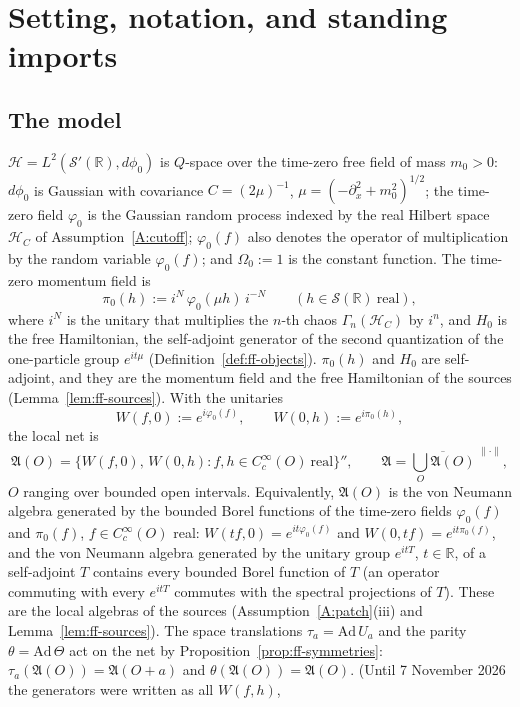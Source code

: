 \documentclass[11pt,a4paper]{article}
\theoremstyle{plain}
\theoremstyle{definition}
\theoremstyle{plain}
\theoremstyle{definition}
\newcommand{\R}{\mathbb{R}}
\newcommand{\A}{\mathfrak{A}}
\newcommand{\HH}{\mathcal{H}}
\newcommand{\Om}{\Omega}
\begin{document}
\section{Setting, notation, and standing imports}\label{sec:setting}

\subsection{The model}\label{subsec:model}

$\HH=L^2(\mathcal S'(\R),d\phi_0)$ is $Q$-space over the time-zero free field of mass $m_0>0$:
$d\phi_0$ is Gaussian with covariance $C=(2\mu)^{-1}$, $\mu=(-\partial_x^2+m_0^2)^{1/2}$; the
time-zero field $\varphi_0$ is the Gaussian random process indexed by the real Hilbert space
$\HH_C$ of Assumption~\ref{A:cutoff}; $\varphi_0(f)$ also denotes the operator of
multiplication by the random variable $\varphi_0(f)$; and $\Om_0:=1$ is the constant function.
The time-zero momentum field is
\[
 \pi_0(h):=i^N\,\varphi_0(\mu h)\,i^{-N}\qquad(h\in\mathcal S(\R)\ \text{real}),
\]
where $i^N$ is the unitary that multiplies the $n$-th chaos $\Gamma_n(\HH_C)$ by $i^n$, and
$H_0$ is the free Hamiltonian, the self-adjoint generator of the second quantization of the
one-particle group $e^{it\mu}$ (Definition~\ref{def:ff-objects}).  $\pi_0(h)$ and $H_0$ are
self-adjoint, and they are the momentum field and the free Hamiltonian of the sources
(Lemma~\ref{lem:ff-sources}).  With the unitaries
\[
 W(f,0):=e^{i\varphi_0(f)},\qquad W(0,h):=e^{i\pi_0(h)},
\]
the local net is
\[
\A(O)=\{W(f,0),\,W(0,h):f,h\in C_c^\infty(O)\ \text{real}\}'',\qquad
\A=\overline{\textstyle\bigcup_O\A(O)}^{\;\|\cdot\|} ,
\]
$O$ ranging over bounded open intervals.  Equivalently, $\A(O)$ is the von Neumann algebra
generated by the bounded Borel functions of the time-zero fields $\varphi_0(f)$ and
$\pi_0(f)$, $f\in C_c^\infty(O)$ real: $W(tf,0)=e^{it\varphi_0(f)}$ and $W(0,tf)=e^{it\pi_0(f)}$,
and the von Neumann algebra generated by the unitary group $e^{itT}$, $t\in\R$, of a
self-adjoint $T$ contains every bounded Borel function of $T$ (an operator commuting with
every $e^{itT}$ commutes with the spectral projections of $T$).  These are the local algebras
of the sources (Assumption~\ref{A:patch}(iii) and Lemma~\ref{lem:ff-sources}).  The space
translations $\tau_a=\mathrm{Ad}\,U_a$ and the parity $\theta=\mathrm{Ad}\,\Theta$ act on the
net by Proposition~\ref{prop:ff-symmetries}: $\tau_a(\A(O))=\A(O+a)$ and
$\theta(\A(O))=\A(O)$.  (Until 7 November 2026 the generators were written as all $W(f,h)$,
\end{document}
